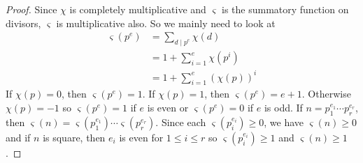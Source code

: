 \documentclass[elemannt.tex]{subfile}
\begin{document}
		\begin{proof}
			Since $\chi$ is completely multiplicative and $\varsigma$ is the summatory function on divisors, $\varsigma$ is multiplicative also. So we mainly need to look at
				\begin{align*}
					\varsigma(p^{e})
						& = \sum_{d\mid p^{e}}\chi(d)\\
						& = 1+\sum_{i=1}^{e}\chi(p^{i})\\
						& = 1+\sum_{i=1}^{e}(\chi(p))^{i}
				\end{align*}
			If $\chi(p)=0$, then $\varsigma(p^{e})=1$. If $\chi(p)=1$, then $\varsigma(p^{e})=e+1$. Otherwise $\chi(p)=-1$ so $\varsigma(p^{e})=1$ if $e$ is even or $\varsigma(p^{e})=0$ if $e$ is odd. If $n=p_{1}^{e_{1}}\cdots p_{r}^{e_{r}}$, then $\varsigma(n)=\varsigma(p_{1}^{e_{1}})\cdots\varsigma(p_{r}^{e_{r}})$. Since each $\varsigma(p_{i}^{e_{i}})\geq0$, we have $\varsigma(n)\geq0$ and if $n$ is square, then $e_{i}$ is even for $1\leq i\leq r$ so $\varsigma(p_{i}^{e_{i}})\geq 1$ and $\varsigma(n)\geq1$.
		\end{proof}
\end{document}

